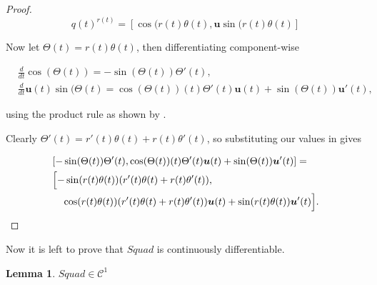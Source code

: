 \documentclass[a4paper, 11pt]{article}
\newtheorem{lemma}{Lemma}
\begin{document}
\begin{proof}

    \[
        q(t)^{r(t)} = [\cos(r(t)\theta(t),\boldsymbol{u}\sin(r(t)\theta(t)]
    \]

    Now let $\Theta(t) =r(t) \theta(t)$, then differentiating component-wise

    \begin{align*}
        &\frac{d}{dt}\cos(\Theta(t))  = -\sin(\Theta(t))\Theta'(t),\\&
        \frac{d}{dt}\boldsymbol{u}(t)\sin(\Theta(t) = \cos(\Theta(t))(t)\Theta'(t)\boldsymbol{u}(t) +\sin(\Theta(t))\boldsymbol{u}'(t), 
    \end{align*}

    using the product rule as shown by \citet[p.~24]{dam_koch_lillholm_1998}.

    Clearly $\Theta'(t) = r'(t)\theta(t) + r(t)\theta'(t)$, so substituting our values in gives

    \begin{align*}
        &[-\sin(\Theta(t))\Theta'(t),\cos(\Theta(t))(t)\Theta'(t)\boldsymbol{u}(t) +\sin(\Theta(t))\boldsymbol{u}'(t) ] = \\
        & \Bigl[ -\sin(r(t)\theta(t)) (r'(t)\theta(t) + r(t)\theta'(t)), \\
    &\quad \cos(r(t)\theta(t)) (r'(t)\theta(t) + r(t)\theta'(t)) \boldsymbol{u}(t) + \sin(r(t)\theta(t)) \boldsymbol{u}'(t) \Bigr].
    \end{align*}
\end{proof}

Now it is left to prove that $Squad$ is continuously differentiable. 
\begin{lemma}

    $Squad \in \mathcal{C}^1$      
    \citep[pp.~52--54]{dam_koch_lillholm_1998}
\end{lemma}
\end{document}
